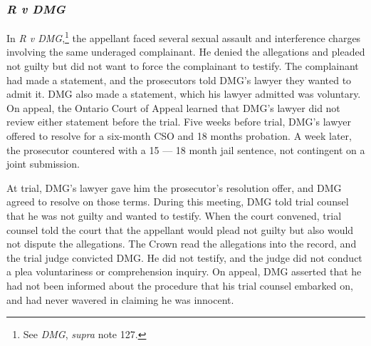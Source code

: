 \subsubsection{\textit{R v DMG}}

In \textit{R v DMG},\footnote{See \textit{DMG}, \textit{supra} note 127.} the appellant faced several sexual assault and interference charges involving the same underaged complainant. He denied the allegations and pleaded not guilty but did not want to force the complainant to testify. The complainant had made a statement, and the prosecutors told DMG's lawyer they wanted to admit it. DMG also made a statement, which his lawyer admitted was voluntary. On appeal, the Ontario Court of Appeal learned that DMG's lawyer did not review either statement before the trial. Five weeks before trial, DMG's lawyer offered to resolve for a six-month CSO and 18 months probation. A week later, the prosecutor countered with a 15 — 18 month jail sentence, not contingent on a joint submission. 

At trial, DMG's lawyer gave him the prosecutor's resolution offer, and DMG agreed to resolve on those terms. During this meeting, DMG told trial counsel that he was not guilty and wanted to testify. When the court convened, trial counsel told the court that the appellant would plead not guilty but also would not dispute the allegations. The Crown read the allegations into the record, and the trial judge convicted DMG. He did not testify, and the judge did not conduct a plea voluntariness or comprehension inquiry. On appeal, DMG asserted that he had not been informed about the procedure that his trial counsel embarked on, and had never wavered in claiming he was innocent.

